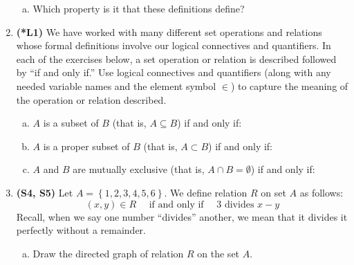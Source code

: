 \documentclass[12pt]{article}
\begin{document}
\begin{enumerate}
\begin{enumerate}[(a)]
			\item Which property is it that these definitions define?
			\end{enumerate}
		
		\item %
		\textbf{(*L1)} We have worked with many different set operations and relations whose formal definitions involve our logical connectives and quantifiers. In each of the exercises below, a set operation or relation is described followed by ``if and only if.'' Use logical connectives and quantifiers (along with any needed variable names and the element symbol $\in$) to capture the meaning of the operation or relation described.
		
		\begin{enumerate}[(a)]
			\item $A$ is a subset of $B$ (that is, $A \subseteq B$) if and only if:
			\underline{\hspace{5cm}} %
			
			
			\item $A$ is a proper subset of $B$ (that is, $A \subset B$) if and only if: \underline{\hspace{5cm}}
			
			\item $A$ and $B$ are mutually exclusive (that is, $A \cap B = \emptyset$) if and only if:\underline{\hspace{5cm}}
			
		\end{enumerate}
		
		\item %
		\textbf{(S4, S5)} Let $A=\left\{1,2,3,4,5,6\right\}$. We define relation $R$ on set $A$ as follows:
		\[(x,y) \in R \quad  \textrm{ if and only if } \quad 3 \textrm{ divides } x-y\]
		Recall, when we say one number ``divides'' another, we mean that it divides it perfectly without a remainder. 
		
		\begin{enumerate}[(a)]	
			\item Draw the directed graph of relation $R$ on the set $A$.
			

\end{enumerate}
\end{enumerate}
\end{document}
